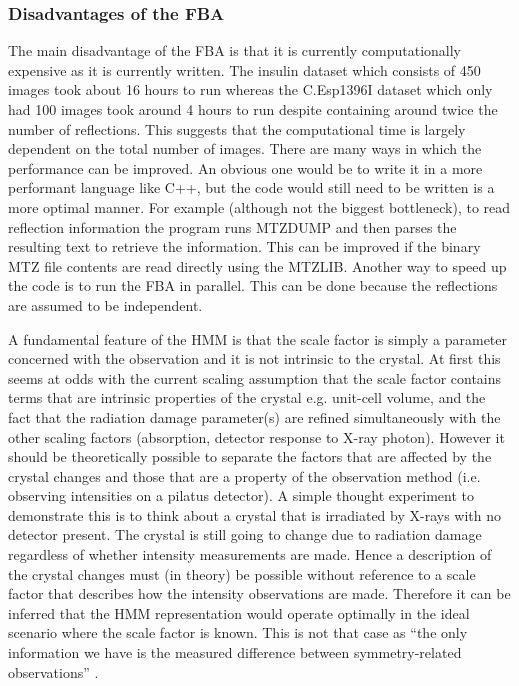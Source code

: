 \subsubsection{Disadvantages of the FBA}
\label{subs:Disadvantages of the FBA}
The main disadvantage of the FBA is that it is currently computationally expensive as it is currently written.
The insulin dataset which consists of 450 images took about 16 hours to run whereas the C.Esp1396I dataset which only had 100 images took around 4 hours to run despite containing around twice the number of reflections.
This suggests that the computational time is largely dependent on the total number of images.
There are many ways in which the performance can be improved.
An obvious one would be to write it in a more performant language like C++, but the code would still need to be written is a more optimal manner.
For example (although not the biggest bottleneck), to read reflection information the program runs MTZDUMP and then parses the resulting text to retrieve the information.
This can be improved if the binary MTZ file contents are read directly using the MTZLIB.
Another way to speed up the code is to run the FBA in parallel.
This can be done because the reflections are assumed to be independent.

A fundamental feature of the HMM is that the scale factor is simply a parameter concerned with the observation and it is not intrinsic to the crystal.
At first this seems at odds with the current scaling assumption that the scale factor contains terms that are intrinsic properties of the crystal e.g. unit-cell volume, and the fact that the radiation damage parameter(s) are refined simultaneously with the other scaling factors (absorption, detector response to X-ray photon).
However it should be theoretically possible to separate the factors that are affected by the crystal changes and those that are a property of the observation method (i.e. observing intensities on a pilatus detector).
A simple thought experiment to demonstrate this is to think about a crystal that is irradiated by X-rays with no detector present.
The crystal is still going to change due to radiation damage regardless of whether intensity measurements are made.
Hence a description of the crystal changes must (in theory) be possible without reference to a scale factor that describes how the intensity observations are made.
Therefore it can be inferred that the HMM representation would operate optimally in the ideal scenario where the scale factor is known.
This is not that case as ``the only information we have is the measured difference between symmetry-related observations'' \cite{evans2005}.

